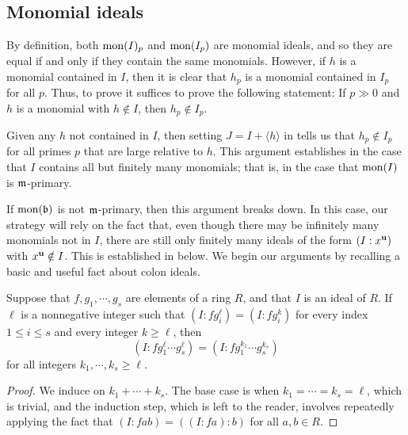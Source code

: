 \documentclass[11pt]{amsart}
\begin{document}
\subsection{Monomial ideals} \label{monomial-ideals: S}


By definition, both $\operatorname{mon}(I)_p$ and $\operatorname{mon}(I_p)$ are monomial ideals, and so they are equal if and only if they contain the same monomials.  However, if $h$ is a monomial contained in $I$, then it is clear that $h_p$ is a monomial contained in $I_p$ for all $p$.  Thus, to prove  it suffices to prove the following statement:  If $p \gg 0$ and $h$ is a monomial with $h \notin I$, then $h_p \notin I_p$.

Given any $h$ not contained in $I$, then setting $J = I + \langle h \rangle$ in  tells us that $h_p \notin I_p$ for all primes $p$ that are large relative to $h$.  This argument establishes  in the case that $I$ contains all but finitely many monomials;  that is, in the case that $ \operatorname{mon}(I)$ is $\mathfrak{m}$-primary.

If $\operatorname{mon}(\mathfrak{b})$ is not $\mathfrak{m}$-primary, then this argument breaks down.  In this case, our strategy will rely on the fact that, even though there may be infinitely many monomials not in $I$, there are still only finitely many ideals of the form $(I:x^{\mathbf{u}})$ with $x^{\mathbf{u}} \notin I$.    This is established in  below.  We begin our arguments by recalling a basic and useful fact about colon ideals.




\begin{lemma}
\label{colon-product-stabilization: L}
  Suppose that $f,g_1, \cdots, g_s$ are elements of a ring $R$, and that $I$ is an ideal of $R$.
If $\ell$ is a nonnegative integer such that $(I: f g_i^\ell) = (I: f g_i^k)$ for every index $1 \leq i \leq s$ and every integer $k \geq \ell$, then \[ (I: f g_1^\ell \cdots g_s^\ell) = (I: f g_1^{k_1} \cdots g_s^{k_s})\] for all integers $k_1, \cdots, k_s \geq \ell$.
\end{lemma}

\begin{proof}
We induce on $k_1 + \cdots + k_s$.  The base case is when $k_1 = \cdots = k_s = \ell$, which is trivial, and the induction step, which is left to the reader, involves repeatedly applying the fact that $(I:fab) = ((I:fa):b)$ for all $a,b \in R$.
\end{proof}
\end{document}
